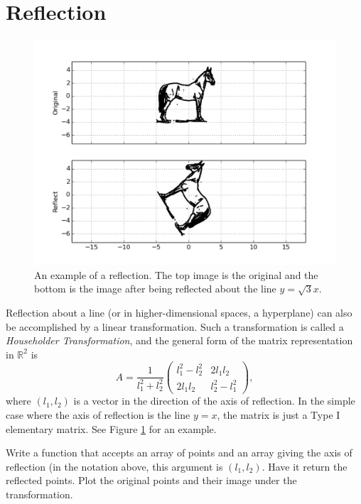 \section*{Reflection}
\begin{figure}
\centering
\includegraphics[width=\textwidth]{reflection.pdf}
\caption{An example of a reflection.
The top image is the original and the bottom is the image after
being reflected about the line $y = \sqrt{3}x$.}
\label{basis:reflection}
\end{figure}
Reflection about a line (or in higher-dimensional spaces, a hyperplane) can also be
accomplished by a linear transformation. Such a transformation is called a
\emph{Householder Transformation}, and the general form of the matrix representation in
$\mathbb{R}^2$ is
\[
A = \frac{1}{l_1^2 + l_2^2}
\begin{pmatrix}
l_1^2 - l_2^2 & 2l_1l_2 \\
2l_1l_2 & l_2^2 - l_1^2
\end{pmatrix},
\]
where $(l_1, l_2)$ is a vector in the direction of the axis of reflection. In the simple
case where the axis of reflection is the line $y=x$, the matrix is just a Type I elementary
matrix. See Figure \ref{basis:reflection} for an example.

\begin{problem}
Write a function that accepts an array of points and an array giving the axis of
reflection (in the notation above, this argument is $(l_1, l_2)$.
Have it return the reflected points.
Plot the original points and their image under the transformation.
\end{problem}

